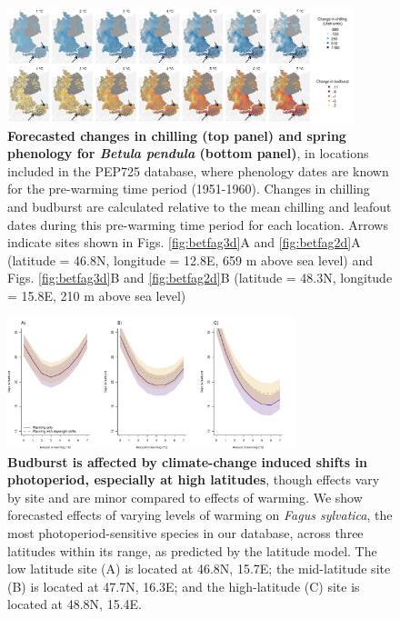 \documentclass{article}
\begin{document}
\begin{figure}[h!]
\centering
\noindent \includegraphics[width=0.90\textwidth]{..//..//analyses/bb_analysis/figures/forecasting/heatmapsbetpepfinalarrows.png}
\caption{\textbf{Forecasted changes in chilling (top panel) and spring phenology for \emph{Betula pendula} (bottom panel)}, in locations included in the PEP725 database, where phenology dates are known for the pre-warming time period (1951-1960). Changes in chilling and budburst are calculated relative to the mean chilling and leafout dates during this pre-warming time period for each location. Arrows indicate sites shown in Figs. \ref{fig:betfag3d}A and \ref{fig:betfag2d}A (latitude = 46.8\degree N, longitude =  12.8\degree E, 659 m above sea level) and Figs. \ref{fig:betfag3d}B and \ref{fig:betfag2d}B (latitude = 48.3\degree N, longitude =  15.8\degree E, 210 m above sea level)} 
\label{fig:foremap}
\end{figure}

\begin{figure}[h!]
\centering
\noindent \includegraphics[width=0.75\textwidth]{..//..//analyses/bb_analysis/figures/forecasting/fagsyl_3lats.pdf}
\caption{\textbf{Budburst is affected by climate-change induced shifts in photoperiod, especially at high latitudes}, though effects vary by site and are minor compared to effects of warming. We show forecasted effects of varying levels of warming on \emph{Fagus sylvatica}, the most photoperiod-sensitive species in our database, across three latitudes within its range, as predicted by the latitude model. The low latitude site (A) is  located at 46.8\degree N, 15.7\degree E; the mid-latitude site (B) is located at 47.7\degree N, 16.3\degree E; and the high-latitude (C) site is located at 48.8\degree N, 15.4\degree E.}
\label{fig:fagsyllat}
\end{figure}
\end{document}
